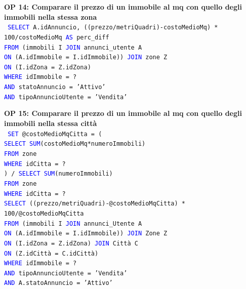 \documentclass[a4paper,12pt]{report}
\begin{document}
            \newpage
            \noindent
            \textbf{OP 14: Comparare il prezzo di un immobile al mq con quello degli immobili nella stessa zona} \\
            \texttt{
                \textcolor{blue}{SELECT} A.idAnnuncio, ((prezzo/metriQuadri)-costoMedioMq) * 100/costoMedioMq \textcolor{blue}{AS} perc\_diff\\
                \textcolor{blue}{FROM} (immobili I \textcolor{blue}{JOIN} annunci\_utente A  \\
                \textcolor{blue}{ON} (A.idImmobile = I.idImmobile)) \textcolor{blue}{JOIN} zone Z \\
                \textcolor{blue}{ON} (I.idZona = Z.idZona) \\
                \textcolor{blue}{WHERE} idImmobile = ? \\
                \textcolor{blue}{AND} statoAnnuncio = 'Attivo' \\
                \textcolor{blue}{AND} tipoAnnuncioUtente = 'Vendita' \\
            }
            
            \noindent
            \textbf{OP 15: Comparare il prezzo di un immobile al mq con quello degli immobili nella stessa città} \\
            \texttt{
                \textcolor{blue}{SET} @costoMedioMqCitta = (\\
                    \null\qquad\textcolor{blue}{SELECT SUM}(costoMedioMq*numeroImmobili) \\
                    \null\qquad \textcolor{blue}{FROM} zone \\
                    \null\qquad \textcolor{blue}{WHERE} idCitta = ? \\
                    \null\qquad) / \textcolor{blue}{SELECT SUM}(numeroImmobili) \\
                    \null\qquad\textcolor{blue}{FROM} zone  \\
                    \null\qquad\textcolor{blue}{WHERE} idCitta = ? \\
                \textcolor{blue}{SELECT} ((prezzo/metriQuadri)-@costoMedioMqCitta) * 100/@costoMedioMqCitta \\
                \textcolor{blue}{FROM} (immobili I \textcolor{blue}{JOIN} annunci\_Utente A  \\
                \textcolor{blue}{ON} (A.idImmobile = I.idImmobile)) \textcolor{blue}{JOIN} Zone Z \\
                \textcolor{blue}{ON} (I.idZona = Z.idZona) \textcolor{blue}{JOIN} Città C \\
                \textcolor{blue}{ON} (Z.idCittà = C.idCittà) \\
                \textcolor{blue}{WHERE} idImmobile = ? \\
                \textcolor{blue}{AND} tipoAnnuncioUtente = 'Vendita' \\
                \textcolor{blue}{AND} A.statoAnnuncio = 'Attivo' \\
            }
\end{document}
